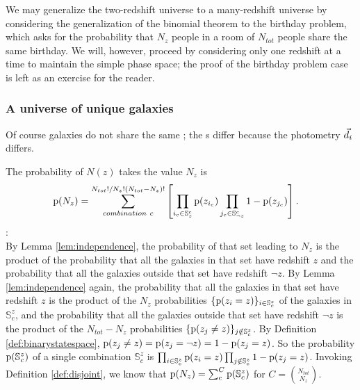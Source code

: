 We may generalize the two-redshift universe to a many-redshift universe by considering the generalization of the binomial theorem to the birthday problem, which asks for the probability that $N_{z}$ people in a room of $N_{tot}$ people share the same birthday.
We will, however, proceed by considering only one redshift at a time to maintain the simple phase space; the proof of the birthday problem case is left as an exercise for the reader.

\subsubsection{A universe of unique galaxies}

Of course galaxies do not share the same \pzpdf; the \pzpdf s differ because the photometry $\vec{d}_{i}$ differs.
\begin{lemma}\label{lem:unique}
	The probability of $N(z)$ takes the value $N_{z}$ is 
	\begin{align}
	\eqlabel{eq:general}
	\pr{N_{z}} &= \sum_{combination\ c}^{N_{tot}! / N_{z}! (N_{tot} - N_{z})!} \left[ \prod_{i_{c} \in \mathbb{S}_{z}^{c}} \pr{z_{i_{c}}} \prod_{j_{c} \in \mathbb{S}_{\lnot z}^{c}} 1 - \pr{z_{j_{c}}} \right] .
	\end{align}
	:\\
	By Lemma \ref{lem:independence}, the probability of that set leading to $N_{z}$ is the product of the probability that all the galaxies in that set have redshift $z$ and the probability that all the galaxies outside that set have redshift $\lnot z$.
	By Lemma \ref{lem:independence} again, the probability that all the galaxies in that set have redshift $z$ is the product of the $N_{z}$ probabilities $\{\mathrm{p}(z_{i} = z)\}_{i \in \mathbb{S}^{z}_{c}}$ of the galaxies in $\mathbb{S}^{z}_{c}$, and the probability that all the galaxies outside that set have redshift $\lnot z$ is the product of the $N_{tot} - N_{z}$ probabilities $\{\mathrm{p}(z_{j} \neq z)\}_{j \notin \mathbb{S}^{z}_{c}}$.
	By Definition \ref{def:binarystatespace}, $\mathrm{p}(z_{j} \neq z) = \mathrm{p}(z_{j} = \lnot z) = 1 - \mathrm{p}(z_{j} = z)$.
	So the probability $\mathrm{p}(\mathbb{S}^{z}_{c})$ of a single combination $\mathbb{S}^{z}_{c}$ is $\prod_{i \in \mathbb{S}^{z}_{c}} \mathrm{p}(z_{i} = z) \prod_{j \notin \mathbb{S}^{z}_{c}} 1 - \mathrm{p}(z_{j} = z)$.
	Invoking Definition \ref{def:disjoint}, we know that $\mathrm{p}(N_{z}) = \sum_{c}^{C} \mathrm{p}(\mathbb{S}^{z}_{c})$ for $C = \binom{N_{tot}}{N_{z}}$.
\end{lemma}

